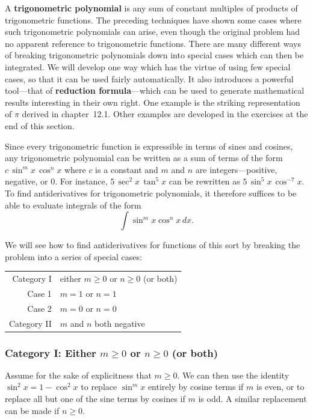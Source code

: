 A {\bf trigonometric polynomial} is
any sum of constant multiples of products of trigonometric functions.
The preceding techniques have shown some cases where such
trigonometric polynomials can arise, even though the original problem
had no apparent reference to trigonometric functions.  There are many
different ways of breaking trigonometric polynomials down into special
cases which can then be integrated.  We will develop one way which has
the virtue of using few special cases, so that it can be used fairly
automatically.  It also introduces a powerful tool---that of {\bf
  reduction formula}---which can be used to generate mathematical
results interesting in their own right.  One example is the striking
representation of $\pi$ derived in chapter~12.1.  Other examples are
developed in the exercises at the end of this section.

Since every trigonometric function is expressible in terms of sines
and cosines, any trigonometric polynomial can be written as a sum of
terms of the form $c\,\sin^m{x}\,\cos^n{x}$ where $c$ is a constant
and $m$ and $n$ are integers---positive, negative, or 0.  For
instance, $5\,\sec^2{x}\,\tan^5{x}$ can be rewritten as
$5\,\sin^5{x}\,\cos^{-7}{x}$. To find antiderivatives for
trigonometric polynomials, it therefore suffices to be able to
evaluate integrals of the form
\[
\int \sin^m{x}\cos^n{x}\,dx.
\]

We will see how to find antiderivatives for functions of this sort by
breaking the problem into a series of special cases:


\begin{tabular}{rl}
Category I&either $m\geq 0$ or $n\geq 0$ (or both) \\
Case 1&$m=1$ or $n=1$ \\
Case 2&$m=0$ or $n=0$ \\
Category II& $m$ and $n$ both negative \\
\end{tabular}

\subsubsection{Category I: Either \boldmath $m\geq 0$ or $n\geq 0$ (or both)}
\label{subsubsec:category-i-either-boldmath-mgeq-0-or-ngeq-0-or-both}

Assume for the sake of explicitness that $m\geq 0$. We can then use
the identity $\sin^2{x}=1-\cos^2{x}$ to replace $\sin^m{x}$ entirely
by cosine terms if $m$ is even, or to replace all but one of the sine
terms by cosines if $m$ is odd.  A similar replacement can be made if
$n\geq 0$.







